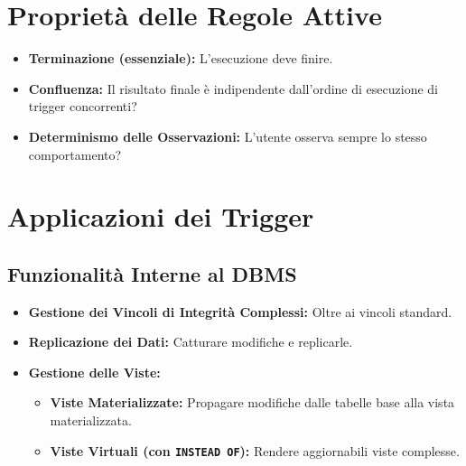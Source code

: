 	\section{Proprietà delle Regole Attive}
	\begin{itemize}
		\item \textbf{Terminazione (essenziale):} L'esecuzione deve finire.
		\item \textbf{Confluenza:} Il risultato finale è indipendente dall'ordine di esecuzione di trigger concorrenti?
		\item \textbf{Determinismo delle Osservazioni:} L'utente osserva sempre lo stesso comportamento?
	\end{itemize}
	
	\section{Applicazioni dei Trigger}
	\subsection{Funzionalità Interne al DBMS}
	\begin{itemize}
		\item \textbf{Gestione dei Vincoli di Integrità Complessi:} Oltre ai vincoli standard.
		\item \textbf{Replicazione dei Dati:} Catturare modifiche e replicarle.
		\item \textbf{Gestione delle Viste:}
		\begin{itemize}
			\item \textbf{Viste Materializzate:} Propagare modifiche dalle tabelle base alla vista materializzata.
			\item \textbf{Viste Virtuali (con \texttt{INSTEAD OF}):} Rendere aggiornabili viste complesse.
		\end{itemize}
	\end{itemize}
	
